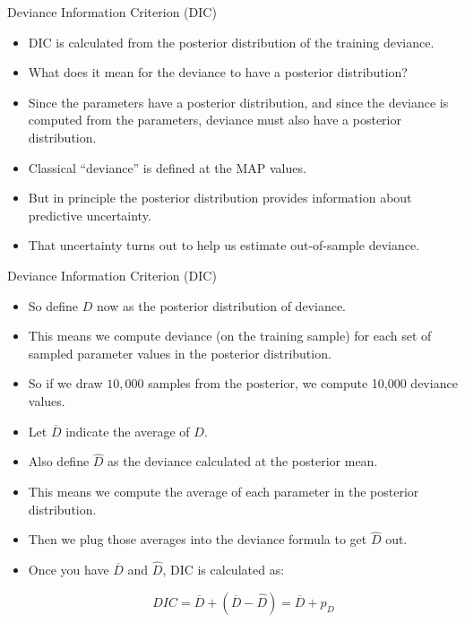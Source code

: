 \documentclass[handout]{beamer}
\begin{document}
\begin{frame}{Deviance Information Criterion (DIC)}
\scriptsize{

\begin{itemize}
\item DIC is calculated from the posterior distribution of the training deviance.
\item What does it mean for the deviance to have a posterior distribution?
\item Since the parameters have a posterior distribution, and since the deviance is computed from the parameters, deviance must also have a posterior distribution.  
\item Classical ``deviance'' is defined at the
MAP values.
\item But in principle the posterior distribution provides information about predictive uncertainty.
\item That uncertainty turns out to help us estimate out-of-sample deviance.


\end{itemize}


} 
\end{frame}


\begin{frame}{Deviance Information Criterion (DIC)}
\scriptsize{

\begin{itemize}
\item So define $D$ now as the posterior distribution of deviance. 
\item This means we compute deviance (on the training sample) for each set of sampled parameter values in the posterior distribution. 
\item So if we draw $10,000$ samples from the posterior, we compute 10,000 deviance values. 
\item Let $\overline{D}$ indicate the average of $D$. 
\item Also define $\hat{D}$ as the deviance calculated at the posterior mean. 
\item This means we compute the average of each parameter in the posterior distribution. 
\item Then we plug those averages into the deviance formula to get $\hat{D}$ out.
\item Once you have $\overline{D}$ and $\hat{D}$, DIC is calculated as:

\begin{equation}
DIC = \overline{D}+ (\overline{D}-\hat{D}) =  \overline{D} + p_D
\end{equation}



\end{itemize}


} 
\end{frame}
\end{document}
